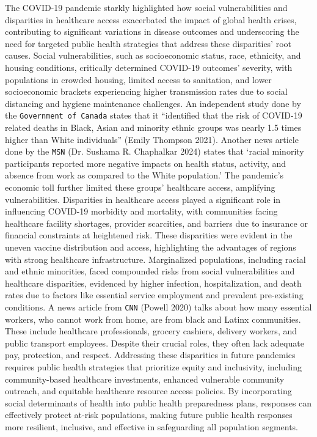 \documentclass[
  letterpaper,
  DIV=11,
  numbers=noendperiod]{scrartcl}
\begin{document}
The COVID-19 pandemic starkly highlighted how social vulnerabilities and
disparities in healthcare access exacerbated the impact of global health
crises, contributing to significant variations in disease outcomes and
underscoring the need for targeted public health strategies that address
these disparities' root causes. Social vulnerabilities, such as
socioeconomic status, race, ethnicity, and housing conditions,
critically determined COVID-19 outcomes' severity, with populations in
crowded housing, limited access to sanitation, and lower socioeconomic
brackets experiencing higher transmission rates due to social distancing
and hygiene maintenance challenges. An independent study done by the
\texttt{Government\ of\ Canada} states that it ``identified that the
risk of COVID-19 related deaths in Black, Asian and minority ethnic
groups was nearly 1.5 times higher than White individuals'' (Emily
Thompson 2021). Another news article done by the \texttt{MSN} (Dr.
Sushama R. Chaphalkar 2024) states that `racial minority participants
reported more negative impacts on health status, activity, and absence
from work as compared to the White population.' The pandemic's economic
toll further limited these groups' healthcare access, amplifying
vulnerabilities. Disparities in healthcare access played a significant
role in influencing COVID-19 morbidity and mortality, with communities
facing healthcare facility shortages, provider scarcities, and barriers
due to insurance or financial constraints at heightened risk. These
disparities were evident in the uneven vaccine distribution and access,
highlighting the advantages of regions with strong healthcare
infrastructure. Marginalized populations, including racial and ethnic
minorities, faced compounded risks from social vulnerabilities and
healthcare disparities, evidenced by higher infection, hospitalization,
and death rates due to factors like essential service employment and
prevalent pre-existing conditions. A news article from \texttt{CNN}
(Powell 2020) talks about how many essential workers, who cannot work
from home, are from black and Latinx communities. These include
healthcare professionals, grocery cashiers, delivery workers, and public
transport employees. Despite their crucial roles, they often lack
adequate pay, protection, and respect. Addressing these disparities in
future pandemics requires public health strategies that prioritize
equity and inclusivity, including community-based healthcare
investments, enhanced vulnerable community outreach, and equitable
healthcare resource access policies. By incorporating social
determinants of health into public health preparedness plans, responses
can effectively protect at-risk populations, making future public health
responses more resilient, inclusive, and effective in safeguarding all
population segments.
\end{document}

